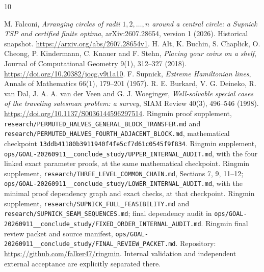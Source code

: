 \documentclass[11pt]{article}
\theoremstyle{definition}\newtheorem{definition}[theorem]{Definition}
\theoremstyle{remark}\newtheorem{remark}[theorem]{Remark}
\begin{document}
\begin{thebibliography}{10}
\small\raggedright
{} M. Falconi, \emph{Arranging circles of radii $1,2,\ldots,n$
around a central circle: a Supnick TSP and certified finite optima},
arXiv:2607.28654, version 1 (2026). Historical snapshot.
\url{https://arxiv.org/abs/2607.28654v1}.
 H. Alt, K. Buchin, S. Chaplick, O. Cheong, P. Kindermann,
C. Knauer and F. Stehn, \emph{Placing your coins on a shelf}, Journal of
Computational Geometry 9(1), 312--327 (2018).
\url{https://doi.org/10.20382/jocg.v9i1a10}.
 F. Supnick, \emph{Extreme Hamiltonian lines},
Annals of Mathematics 66(1), 179--201 (1957).
 R. E. Burkard, V. G. Deineko, R. van Dal, J. A. A. van der
Veen and G. J. Woeginger, \emph{Well-solvable special cases of the traveling
salesman problem: a survey}, SIAM Review 40(3), 496--546 (1998).
\url{https://doi.org/10.1137/S0036144596297514}.
 Ringmin proof supplement,
\nolinkurl{research/PERMUTED_HALVES_GENERAL_BLOCK_TRANSFER.md} and
\nolinkurl{research/PERMUTED_HALVES_FOURTH_ADJACENT_BLOCK.md},
mathematical checkpoint \texttt{13ddb41180b3911940f4fe5cf7d61c0545f9f834}.
 Ringmin supplement,
\nolinkurl{ops/GOAL-20260911__conclude_study/UPPER_INTERNAL_AUDIT.md},
with the four linked exact parameter proofs, at the same mathematical checkpoint.
 Ringmin supplement,
\nolinkurl{research/THREE_LEVEL_COMMON_CHAIN.md}, Sections 7, 9, 11--12;
\nolinkurl{ops/GOAL-20260911__conclude_study/LOWER_INTERNAL_AUDIT.md},
with the minimal proof dependency graph and exact checks, at that checkpoint.
 Ringmin supplement,
\nolinkurl{research/SUPNICK_FULL_FEASIBILITY.md} and
\nolinkurl{research/SUPNICK_SEAM_SEQUENCES.md}; final dependency audit in
\nolinkurl{ops/GOAL-20260911__conclude_study/FIXED_ORDER_INTERNAL_AUDIT.md}.
 Ringmin final review packet and source manifest,
\nolinkurl{ops/GOAL-20260911__conclude_study/FINAL_REVIEW_PACKET.md}.
Repository: \url{https://github.com/falker47/ringmin}. Internal validation
and independent external acceptance are explicitly separated there.
\end{thebibliography}
\end{document}
